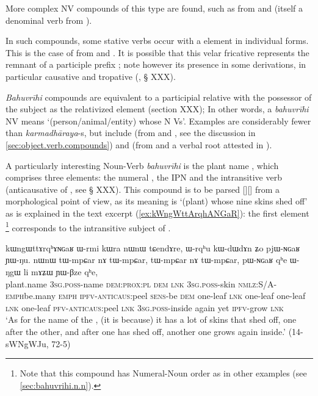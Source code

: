 More complex NV compounds of this type are found, such as  from  and  (itself a denominal verb from ).

In such compounds, some stative verbs occur with a  element in individual forms. This is the case of  from  and . It is possible that this velar fricative represents the remnant of a participle prefix ; note however its presence in some derivations, in particular causative and tropative (, § XXX).
 
\textit{Bahuvrīhi} compounds are equivalent to a participial relative with the possessor of the subject as the relativized element (section XXX); In other words, a \textit{bahuvrīhi} NV means `(person/animal/entity) whose N Vs'. Examples are considerably fewer than \textit{karmadhāraya}-s, but include  (from  and , see the discussion in \ref{sec:object.verb.compounds}) and   (from  and a verbal root   attested in ). 
 
A particularly interesting Noun-Verb \textit{bahuvrīhi} is the plant name , which comprises three elements: the numeral , the IPN  and the intransitive verb  (anticausative of , see § XXX). This compound is to be parsed [][] from a morphological point of view, as its meaning is `(plant) whose nine skins shed off' as is explained in the text excerpt (\ref{ex:kWngWttArqhANGaR}): the first element \footnote{Note that this compound has Numeral-Noun order as in other examples (see \ref{sec:bahuvrihi.n.n}).} corresponds to the intransitive subject of . 

\begin{exe}
\ex \label{ex:kWngWttArqhANGaR}
\gll kɯngɯttɤrqʰɤɴɢaʁ ɯ-rmi kɯra nɯnɯ tɕendɤre, ɯ-rqʰu kɯ-dɯ\redp{}dɤn ʑo pjɯ-ɴɢaʁ ɲɯ-ŋu. nɯnɯ tɯ-mpɕar nɤ tɯ-mpɕar, tɯ-mpɕar nɤ tɯ-mpɕar, pɯ-ɴɢaʁ qʰe ɯ-ŋgɯ li mɤʑɯ ɲɯ-βze qʰe, \\
plant.name \textsc{3sg.poss}-name \textsc{dem:prox:pl} \textsc{dem} \textsc{lnk} \textsc{3sg.poss}-skin \textsc{nmlz}:S/A-\textsc{emph}\redp{}be.many \textsc{emph} \textsc{ipfv}-\textsc{anticaus}:peel \textsc{sens}-be \textsc{dem} one-leaf \textsc{lnk}  one-leaf  one-leaf \textsc{lnk}  one-leaf \textsc{pfv}-\textsc{anticaus}:peel \textsc{lnk} \textsc{3sg.poss}-inside again yet \textsc{ipfv}-grow \textsc{lnk}  \\
\glt `As for the name of the , (it is because) it has a lot of skins that shed off, one after the other, and after one has shed off, another one grows again inside.' (14-sWNgWJu, 72-5)
\end{exe}


